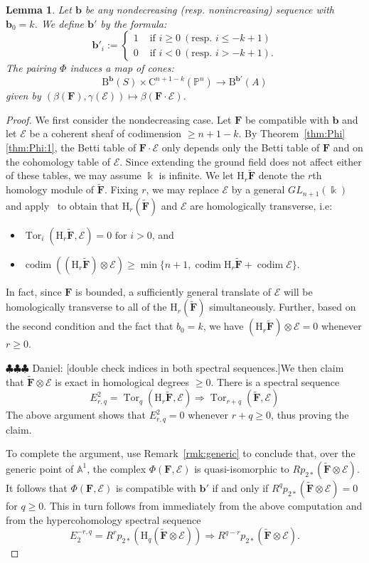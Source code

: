 \documentclass[12pt]{amsart}
\newtheorem{lemma}{Lemma}[section]
\theoremstyle{definition}
\theoremstyle{remark}
\newcommand{\Tor}{\operatorname{Tor}}
\newcommand{\kk}{\Bbbk}
\newcommand{\codim}{\operatorname{codim}}
\newcommand{\PP}{\mathbb{P}}
\renewcommand{\AA}{\mathbb{A}}
\newcommand{\HH}{\mathrm{H}}
\newcommand{\bb}{\mathbf{b}}
\newcommand{\cE}{\mathcal{E}}
\newcommand{\FF}{\mathbf{F}}
\newcommand{\GL}{{GL}}
\newcommand{\CQ}{\mathrm{C}}
\newcommand{\BBQ}{\mathrm{B}}
\newcommand{\daniel}[1]{{\color{green} \sf $\clubsuit\clubsuit\clubsuit$ Daniel: [#1]}}
\begin{document}
\begin{lemma}\label{lem:refined positivity}
Let $\bb$ be any nondecreasing (resp. nonincreasing) sequence with $\bb_0=k$.   We define $\bb'$ by the formula:
\[
\bb'_i:=\begin{cases}
1&\text{ if } i\geq 0 \ (\text{resp. } i\leq -k+1)\\
0&\text{ if } i<0  \ (\text{resp. } i> -k+1).
\end{cases}
\]
The  pairing $\Phi$ induces a map of cones:
\[
\BBQ^{\bb}(S)\times \CQ^{n+1-k}(\PP^n)\to \BBQ^{\bb'}(A)
\]
given by $(\beta(\FF), \gamma(\cE))\mapsto \beta(\FF\cdot \cE)$.
\end{lemma}
\begin{proof}
We first consider the nondecreasing case.  Let $\FF$ be compatible with $\bb$ and let $\cE$ be a coherent sheaf of codimension $\geq n+1-k$.  By Theorem~\ref{thm:Phi}\eqref{thm:Phi:1}, the Betti table of $\FF\cdot \cE$ only depends only the Betti table of $\FF$ and on the cohomology table of $\cE$.  Since extending the ground field does not affect either of these tables, we may assume $\kk$ is infinite.  We let $\HH_r \widetilde{\FF}$ denote the $r$th homology module of $\widetilde{\FF}$.  Fixing $r$, we may replace $\cE$ by a general $\GL_{n+1}(\kk)$ and apply~\cite[Theorem]{miller-speyer} to obtain that $\HH_r(\widetilde{\FF})$ and $\cE$ are homologically transverse, i.e:
\begin{itemize}
	\item $\Tor_i(\HH_r\widetilde{\FF},\cE)=0 \text{ for } i>0$, and
	\item $\codim ((\HH_r\widetilde{\FF})\otimes \cE) \geq \min\{n+1, \codim \HH_r\widetilde{\FF}+\codim \cE\}.$
\end{itemize}
In fact, since $\FF$ is bounded, a sufficiently general translate of $\cE$ will be homologically transverse to all of the $\HH_r(\widetilde{\FF})$ simultaneously.  Further, based on the second condition and the fact that $b_0=k$, we have $(\HH_r\widetilde{\FF})\otimes \cE=0$ whenever $r\geq 0$.

\daniel{double check indices in both spectral sequences.}We then claim that $\widetilde{\FF}\otimes \cE$ is exact in homological degrees $\geq 0$.  There is a spectral sequence
\[
E^2_{r,q}=\Tor_q(\HH_r\widetilde{\FF},\cE)\Rightarrow \Tor_{r+q}(\widetilde{\FF},\cE)
\]
The above argument shows that $E^2_{r,q}=0$ whenever $r+q\geq 0$, thus proving the claim.

To complete the argument, use Remark~\ref{rmk:generic} to conclude that, over the generic point of $\AA^1$, the complex $\Phi(\FF,\cE)$ is quasi-isomorphic to $Rp_{2*}\left(\widetilde{\FF}\otimes \cE\right)$.  It follows that $\Phi(\FF,\cE)$ is compatible with $\bb'$ if and only if $R^qp_{2*}\left(\widetilde{\FF}\otimes \cE\right)=0$ for $q\geq 0$.  This in turn follows from immediately from the above computation and from the hypercohomology spectral sequence
\[
E_2^{-r,q}=R^rp_{2*}(\HH_q(\widetilde{\FF}\otimes \cE))\Rightarrow R^{q-r}p_{2*}(\widetilde{\FF}\otimes \cE).
\]



\end{proof}
\end{document}
